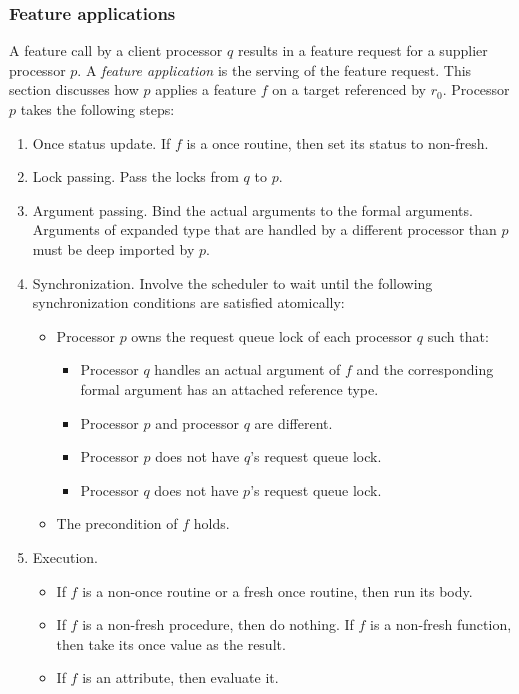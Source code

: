 \subsubsection{Feature applications}\label{sec:feature applications}
A feature call by a client processor $q$ results in a feature request for a supplier processor $p$. A \emph{feature application} is the serving of the feature request. This section discusses how $p$ applies a feature $f$ on a target referenced by $r_{0}$. Processor $p$ takes the following steps:
\begin{enumerate}
	\item Once status update. If $f$ is a once routine, then set its status to non-fresh.
	\item Lock passing. Pass the locks from $q$ to $p$.
	\item Argument passing. Bind the actual arguments to the formal arguments. Arguments of expanded type that are handled by a different processor than $p$ must be deep imported by $p$.
	\item Synchronization. Involve the scheduler to wait until the following synchronization conditions are satisfied atomically:
		\begin{itemize}
			\item Processor $p$ owns the request queue lock of each processor $q$ such that:
				\begin{itemize}
					\item Processor $q$ handles an actual argument of $f$ and the corresponding formal argument has an attached reference type.
					\item Processor $p$ and processor $q$ are different.
					\item Processor $p$ does not have $q$'s request queue lock.
					\item Processor $q$ does not have $p$'s request queue lock.
				\end{itemize}
			\item The precondition of $f$ holds.
		\end{itemize}
	\item Execution.
		\begin{itemize}
			\item If $f$ is a non-once routine or a fresh once routine, then run its body.
			\item If $f$ is a non-fresh procedure, then do nothing. If $f$ is a non-fresh function, then take its once value as the result.
			\item If $f$ is an attribute, then evaluate it.

\end{itemize}
\end{enumerate}
